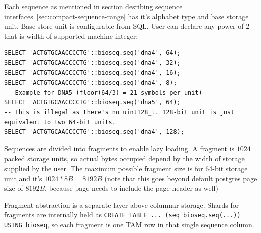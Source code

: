 
Each sequence as mentioned in section desribing sequence interfaces~\ref{sec:compact-sequence-range} has it's alphabet type and base storage unit.
Base store unit is configurable from SQL. User can declare any power of 2 that is width of supported machine integer:

\begin{minipage}{\linewidth}
\begin{lstlisting}[style=bioseq-search-sql,caption={Examples of different base storage units},label={lst:sql-storage-widths}]
SELECT 'ACTGTGCAACCCCTG'::bioseq.seq('dna4', 64);
SELECT 'ACTGTGCAACCCCTG'::bioseq.seq('dna4', 32);
SELECT 'ACTGTGCAACCCCTG'::bioseq.seq('dna4', 16);
SELECT 'ACTGTGCAACCCCTG'::bioseq.seq('dna4', 8);
-- Example for DNA5 (floor(64/3) = 21 symbols per unit)
SELECT 'ACTGTGCAACCCCTG'::bioseq.seq('dna5', 64);
-- This is illegal as there's no uint128_t. 128-bit unit is just equivalent to two 64-bit units.
SELECT 'ACTGTGCAACCCCTG'::bioseq.seq('dna4', 128);
\end{lstlisting}
\end{minipage}

Sequences are divided into fragments to enable lazy loading.
A fragment is $1024$ packed storage units, so actual bytes occupied depend by the width of storage supplied by the user.
The maximum possible fragment size is for 64-bit storage unit and it's $1024*8B = 8192B$ (note that this goes beyond default postgres page size of $8192B$, because page needs to include the page header as well)

Fragment abstraction is a separate layer above columnar storage.
Shards for fragments are internally held as \texttt{CREATE TABLE ... (seq bioseq.seq(...)) USING bioseq}, so each fragment is one TAM row in that single sequence column.



